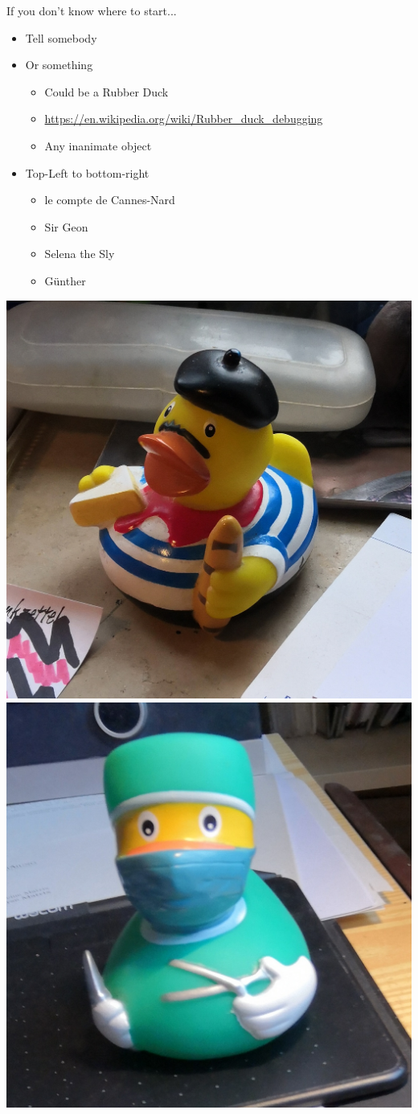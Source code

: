 \begin{frame}{If you don't know where to start...}
%
\begin{center}
	\begin{minipage}{.35\linewidth}
		\begin{itemize}
		\item Tell somebody
		\item Or something
			\begin{itemize}
			\item Could be a Rubber Duck
			\item \url{https://en.wikipedia.org/wiki/Rubber_duck_debugging}
			\item Any inanimate object
			\end{itemize}
		\item Top-Left to bottom-right
			\begin{itemize}
			\item le compte de Cannes-Nard
			\item Sir Geon
			\item Selena the Sly
			\item Günther
			\end{itemize}
		\end{itemize}
	\end{minipage}
	\hspace{1em}
	\begin{minipage}{.5\linewidth}
		\begin{minipage}{\linewidth}
		\includegraphics[width=.45\linewidth]{./gfx/Duck1}
		\hspace{1em}
		\includegraphics[width=.45\linewidth]{./gfx/Duck2}
		\end{minipage}
		

\end{minipage}
\end{center}
\end{frame}
